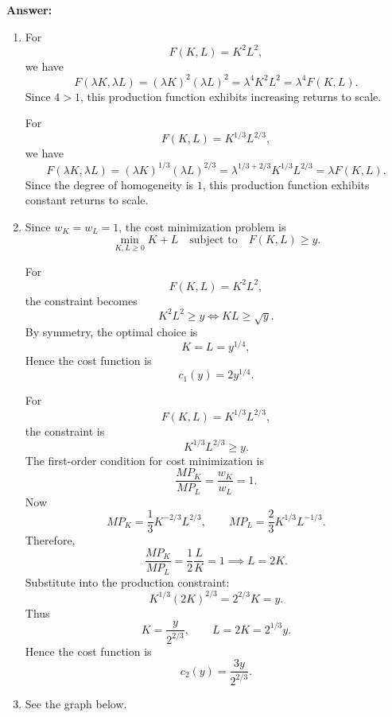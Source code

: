 \documentclass[12pt,a4paper]{article}
\begin{document}
\noindent\textbf{Answer: }\begin{enumerate}[label=\alph*.]
  \item For
  \[
    F(K,L)=K^2L^2,
  \]
  we have
  \[
    F(\lambda K,\lambda L)
    =(\lambda K)^2(\lambda L)^2
    =\lambda^4K^2L^2
    =\lambda^4F(K,L).
  \]
  Since \(4>1\), this production function exhibits increasing returns to scale.

  For
  \[
    F(K,L)=K^{1/3}L^{2/3},
  \]
  we have
  \[
    F(\lambda K,\lambda L)
    =(\lambda K)^{1/3}(\lambda L)^{2/3}
    =\lambda^{1/3+2/3}K^{1/3}L^{2/3}
    =\lambda F(K,L).
  \]
  Since the degree of homogeneity is \(1\), this production function exhibits constant returns to scale.

  \item Since \(w_K=w_L=1\), the cost minimization problem is
  \[
    \min_{K,L\ge 0} K+L
    \quad \text{subject to} \quad
    F(K,L)\ge y.
  \]

  For
  \[
    F(K,L)=K^2L^2,
  \]
  the constraint becomes
  \[
    K^2L^2\ge y
    \iff
    KL\ge \sqrt y.
  \]
  By symmetry, the optimal choice is
  \[
    K=L=y^{1/4},
  \]
  Hence the cost function is
  \[
    c_1(y)=2y^{1/4}.
  \]

  For
  \[
    F(K,L)=K^{1/3}L^{2/3},
  \]
  the constraint is
  \[
    K^{1/3}L^{2/3}\ge y.
  \]
  The first-order condition for cost minimization is
  \[
    \frac{MP_K}{MP_L}=\frac{w_K}{w_L}=1.
  \]
  Now
  \[
    MP_K=\frac13 K^{-2/3}L^{2/3},
    \qquad
    MP_L=\frac23 K^{1/3}L^{-1/3}.
  \]
  Therefore,
  \[
    \frac{MP_K}{MP_L}
    =\frac{1}{2}\frac{L}{K}=1 \implies L=2K.
  \]
  Substitute into the production constraint:
  \[
    K^{1/3}(2K)^{2/3}=2^{2/3}K=y.
  \]
  Thus
  \[
    K=\frac{y}{2^{2/3}},
    \qquad
    L=2K=2^{1/3}y.
  \]
  Hence the cost function is
  \[
    c_2(y)
    =\frac{3y}{2^{2/3}}.
  \]

  \item See the graph below.
  \begin{center}
  \end{center}




\end{enumerate}
\end{document}
